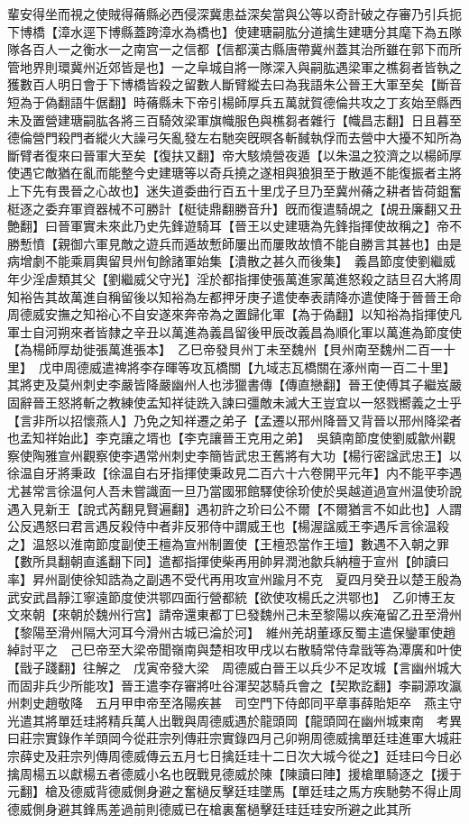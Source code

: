 輩安得坐而視之使賊得蓨縣必西侵深冀患益深矣當與公等以奇計破之存審乃引兵扼下博橋【漳水逕下博縣蓋跨漳水為橋也】使建瑭嗣肱分道擒生建瑭分其麾下為五隊隊各百人一之衡水一之南宫一之信都【信都漢古縣唐帶冀州蓋其治所雖在郭下而所管地界則環冀州近郊皆是也】一之阜城自將一隊深入與嗣肱遇梁軍之樵芻者皆執之獲數百人明日會于下博橋皆殺之留數人斷臂縱去曰為我語朱公晉王大軍至矣【斷音短為于偽翻語牛倨翻】時蓨縣未下帝引楊師厚兵五萬就賀德倫共攻之丁亥始至縣西未及置營建瑭嗣肱各將三百騎效梁軍旗幟服色與樵芻者雜行【幟昌志翻】日且暮至德倫營門殺門者縱火大譟弓矢亂發左右馳突旣暝各斬馘執俘而去營中大擾不知所為斷臂者復來曰晉軍大至矣【復扶又翻】帝大駭燒營夜遁【以朱温之狡濟之以楊師厚使遇它敵猶在亂而能整今史建瑭等以奇兵撓之遂相與狼狽至于散遁不能復振者主將上下先有畏晉之心故也】迷失道委曲行百五十里戊子旦乃至冀州蓨之耕者皆荷鉏奮梃逐之委弃軍資器械不可勝計【梃徒鼎翻勝音升】旣而復遣騎覘之【覘丑廉翻又丑艶翻】曰晉軍實未來此乃史先鋒遊騎耳【晉王以史建瑭為先鋒指揮使故稱之】帝不勝慙憤【親御六軍見敵之遊兵而遁故慙師屢出而屢敗故憤不能自勝言其甚也】由是病增劇不能乘肩輿留貝州旬餘諸軍始集【潰散之甚久而後集】　義昌節度使劉繼威年少淫虐類其父【劉繼威父守光】淫於都指揮使張萬進家萬進怒殺之詰旦召大將周知裕告其故萬進自稱留後以知裕為左都押牙庚子遣使奉表請降亦遣使降于晉晉王命周德威安撫之知裕心不自安遂來奔帝為之置歸化軍【為于偽翻】以知裕為指揮使凡軍士自河朔來者皆隸之辛丑以萬進為義昌留後甲辰改義昌為順化軍以萬進為節度使【為楊師厚劫徙張萬進張本】　乙巳帝發貝州丁未至魏州【貝州南至魏州二百一十里】　戊申周德威遣禆將李存暉等攻瓦橋關【九域志瓦橋關在涿州南一百二十里】其將吏及莫州刺史李嚴皆降嚴幽州人也涉獵書傳【傳直戀翻】晉王使傅其子繼岌嚴固辭晉王怒將斬之教練使孟知祥徒跣入諫曰彊敵未滅大王豈宜以一怒戮嚮義之士乎【言非所以招懷燕人】乃免之知祥遷之弟子【孟遷以邢州降晉又背晉以邢州降梁者也孟知祥始此】李克讓之壻也【李克讓晉王克用之弟】　吳鎮南節度使劉威歙州觀察使陶雅宣州觀察使李遇常州刺史李簡皆武忠王舊將有大功【楊行密諡武忠王】以徐温自牙將秉政【徐温自右牙指揮使秉政見二百六十六卷開平元年】内不能平李遇尤甚常言徐温何人吾未嘗識面一旦乃當國邪館驛使徐玠使於吳越道過宣州温使玠說遇入見新王【說式芮翻見賢遍翻】遇初許之玠曰公不爾【不爾猶言不如此也】人謂公反遇怒曰君言遇反殺侍中者非反邪侍中謂威王也【楊渥諡威王李遇斥言徐温殺之】温怒以淮南節度副使王檀為宣州制置使【王檀恐當作王壇】數遇不入朝之罪【數所具翻朝直遙翻下同】遣都指揮使柴再用帥昇潤池歙兵納檀于宣州【帥讀曰率】昇州副使徐知誥為之副遇不受代再用攻宣州踰月不克　夏四月癸丑以楚王殷為武安武昌靜江寧遠節度使洪鄂四面行營都統【欲使攻楊氏之洪鄂也】　乙卯博王友文來朝【來朝於魏州行宫】請帝還東都丁巳發魏州己未至黎陽以疾淹留乙丑至滑州【黎陽至滑州隔大河耳今滑州古城已淪於河】　維州羌胡董琢反蜀主遣保鑾軍使趙綽討平之　己巳帝至大梁帝聞嶺南與楚相攻甲戌以右散騎常侍韋戩等為潭廣和叶使【戩子踐翻】往解之　戊寅帝發大梁　周德威白晉王以兵少不足攻城【言幽州城大而固非兵少所能攻】晉王遣李存審將吐谷渾契苾騎兵會之【契欺訖翻】李嗣源攻瀛州刺史趙敬降　五月甲申帝至洛陽疾甚　司空門下侍郎同平章事薛貽矩卒　燕主守光遣其將單廷珪將精兵萬人出戰與周德威遇於龍頭岡【龍頭岡在幽州城東南　考異曰莊宗實錄作羊頭岡今從莊宗列傳莊宗實錄四月己卯朔周德威擒單廷珪進軍大城莊宗薛史及莊宗列傳周德威傳云五月七日擒廷珪十二日次大城今從之】廷珪曰今日必擒周楊五以獻楊五者德威小名也旣戰見德威於陳【陳讀曰陣】援槍單騎逐之【援于元翻】槍及德威背德威側身避之奮檛反擊廷珪墜馬【單廷珪之馬方疾馳勢不得止周德威側身避其鋒馬差過前則德威已在槍裏奮檛擊廷珪廷珪安所避之此其所